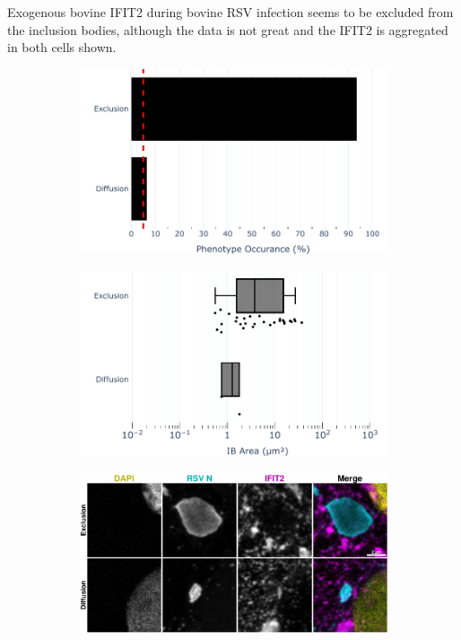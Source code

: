 Exogenous bovine IFIT2 during bovine RSV infection seems to be excluded from the inclusion bodies, although the data is not great and the IFIT2 is aggregated in both cells shown.

\begin{figure}
    \begin{subfigure}{0.495\textwidth}
        \caption{}
        \includegraphics[width=1\linewidth]{10. Chapter 5/Figs/03. IFIT2-FLAG/03. IFIT2F/02. Infection Transfection/07. bar_bi2f_brsv.pdf} 
    \end{subfigure}
    \begin{subfigure}{0.495\textwidth}
        \caption{}
        \includegraphics[width=1\linewidth]{10. Chapter 5/Figs/03. IFIT2-FLAG/03. IFIT2F/02. Infection Transfection/08. box_bi2f_brsv.pdf}
    \end{subfigure}
    \begin{subfigure}{1\textwidth}
        \centering
        \caption{}
        \includegraphics[width=1\linewidth]{10. Chapter 5/Figs/03. IFIT2-FLAG/03. IFIT2F/02. Infection Transfection/09. bi2f-brsv.pdf}

\end{subfigure}
\end{figure}
